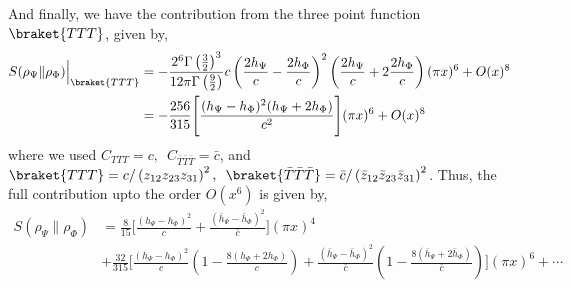 \documentclass[11pt]{article}
\newcommand{\nn}{\nonumber}
\newcommand{\lb}{\left(}
\newcommand{\rb}{\right)}
\begin{document}
And finally, we have the contribution from the three point function $\braket{TTT}$, given by,
\begin{align}
    S(\rho_\Psi\|\rho_\Phi)\Big|_{\braket{TTT}} &= -\frac{2^{6}\Gamma\lb \frac{3}{2}\rb^3}{12\pi \Gamma\lb\frac{9}{2}\rb} c\lb\frac{2h_\Psi}{c}-\frac{2h_\Phi}{c}\rb^2\lb\frac{2h_\Psi}{c} + 2\frac{2h_\Phi}{c}\rb(\pi x)^6 + O(x)^8\\
    &= -\frac{256}{315}\Bigg[
\frac{(h_\Psi-h_\Phi)^2(h_\Psi+2h_\Phi)}{c^2}
\Bigg](\pi x)^6+ O(x)^8
\end{align}
where we used $C_{TTT} = c, \, \, \, C_{\bar{T}\bar{T}\bar{T}} = \bar c$, and $\braket{TTT} = c/\lb z_{12}z_{23}z_{31}\rb^2, \, \, \, \braket{\bar T\bar T\bar T} = \bar c/ \lb\bar z_{12} \bar z_{23}\bar z_{31}\rb^2$. 
Thus, the full contribution upto the order $O(x^6)$ is given by,
\begin{align}
    S(\rho_\Psi\|\rho_\Phi)
&=  \frac{8}{15}
\Bigg[
\frac{(h_\Psi-h_\Phi)^2}{c} 
+\frac{(\bar h_\Psi-\bar h_\Phi)^2}{\bar c}
\Bigg]
(\pi x)^4 \nn \\&
+\frac{32}{315} \Bigg[
\frac{(h_\Psi - h_\Phi)^2}{c} \lb 1- \frac{8(h_\Psi +2 h_\Phi)}{c}\rb + \frac{(\bar h_\Psi - \bar h_\Phi)^2}{\bar c} \lb 1- \frac{8(\bar h_\Psi +2 \bar h_\Phi)}{\bar c}\rb
\Bigg](\pi x)^6 + \cdots
\end{align}

\end{document}
